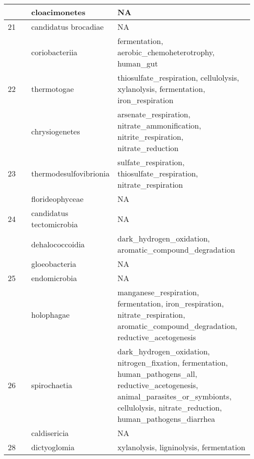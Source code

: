 \documentclass{article}
\begin{document}
\begin{longtable}{|l|c|l|>{\raggedright\arraybackslash}p{6cm}|}
\cline{3-4}
 &  & cloacimonetes & NA\\
\hline
21 &  & candidatus brocadiae & NA\\
\cline{3-4}
 &  & coriobacteriia & fermentation, aerobic\_chemoheterotrophy, human\_gut\\
\hline
22 &  & thermotogae & thiosulfate\_respiration, cellulolysis, xylanolysis, fermentation, iron\_respiration\\
\cline{3-4}
 &  & chrysiogenetes & arsenate\_respiration, nitrate\_ammonification, nitrite\_respiration, nitrate\_reduction\\
\hline
23 &  & thermodesulfovibrionia & sulfate\_respiration, thiosulfate\_respiration, nitrate\_respiration\\
\cline{3-4}
 &  & florideophyceae & NA\\
\hline
24 &  & candidatus tectomicrobia & NA\\
\cline{3-4}
 &  & dehalococcoidia & dark\_hydrogen\_oxidation, aromatic\_compound\_degradation\\
\cline{3-4}
 &  & gloeobacteria & NA\\
\hline
25 &  & endomicrobia & NA\\
\cline{3-4}
 &  & holophagae & manganese\_respiration, fermentation, iron\_respiration, nitrate\_respiration, aromatic\_compound\_degradation, reductive\_acetogenesis\\
\hline
26 &  & spirochaetia & dark\_hydrogen\_oxidation, nitrogen\_fixation, fermentation, human\_pathogens\_all, reductive\_acetogenesis, animal\_parasites\_or\_symbionts, cellulolysis, nitrate\_reduction, human\_pathogens\_diarrhea\\
\cline{3-4}
 &  & caldisericia & NA\\
\hline
28 &  & dictyoglomia & xylanolysis, ligninolysis, fermentation\\
\cline{3-4}
\hline
\end{longtable}
\end{document}
